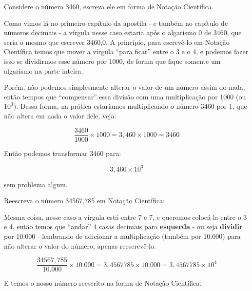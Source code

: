 \begin{exemplo}
    Considere o número 3460, escreva ele em forma de Notação Científica.

    \vspace{0.5cm}

    Como vimos lá no primeiro capítulo da apostila - e também no capítulo de números decimais - a vírgula nesse caso estaria após o algarismo 0 de 3460, que seria o mesmo que escrever 3460,0. A princípio, para escrevê-lo em Notação Científica temos que mover a vírgula ``para ficar'' entre o 3 e o 4, e podemos fazer isso se dividirmos esse número por 1000, de forma que fique somente um algarismo na parte inteira.

    \vspace{0.5cm}

    Porém, não podemos simplesmente alterar o valor de um número assim do nada, então tempos que ``compensar'' essa divisão com uma multiplicação por 1000 (ou \(10^{3}\)). Dessa forma, na prática estaríamos multiplicando o número 3460 por 1, que não altera em nada o valor dele, veja:

    \begin{equation}
        \frac{3460}{1000}\times1000=3,460\times1000=3460
    \end{equation}

    Então podemos transformar 3460 para:

    \begin{equation}
        3,460\times10^3
    \end{equation}

    sem problema algum.
\end{exemplo}

\begin{exemplo}
    Reescreva o número 34567,785 em Notação Científica:

    \vspace{0.5cm}

    Mesma coisa, nesse caso a vírgula está entre 7 e 7, e queremos colocá-la entre o 3 e 4, então temos que ``andar'' 4 casas decimais para \textbf{esquerda} - ou seja \textbf{dividir} por 10.000 - lembrando de adicionar a multiplicação (também por 10.000) para não alterar o valor do número, apenas reescrevê-lo.

    \begin{equation}
        \frac{34567,785}{10.000}\times10.000=3,4567785\times10.000=3,4567785\times10^4
    \end{equation}

    E temos o nosso número reescrito na forma de Notação Científica.
\end{exemplo}

